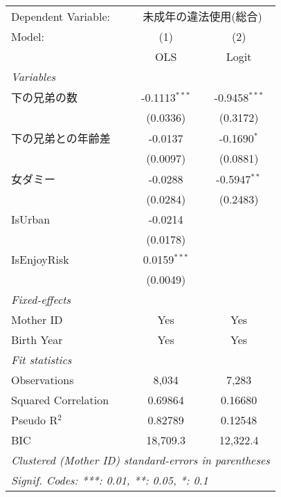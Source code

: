 \documentclass{article}
\begin{document}
\begingroup
\centering
\begin{tabular}{lcc}
   \tabularnewline \midrule \midrule
   Dependent Variable: & \multicolumn{2}{c}{未成年の違法使用(総合)}\\
   Model:              & (1)             & (2)\\  
                       &  OLS            & Logit\\  
   \midrule
   \emph{Variables}\\
   下の兄弟の数        & -0.1113$^{***}$ & -0.9458$^{***}$\\   
                       & (0.0336)        & (0.3172)\\   
   下の兄弟との年齢差  & -0.0137         & -0.1690$^{*}$\\   
                       & (0.0097)        & (0.0881)\\   
   女ダミー            & -0.0288         & -0.5947$^{**}$\\   
                       & (0.0284)        & (0.2483)\\   
   IsUrban             & -0.0214         &   \\   
                       & (0.0178)        &   \\   
   IsEnjoyRisk         & 0.0159$^{***}$  &   \\   
                       & (0.0049)        &   \\   
   \midrule
   \emph{Fixed-effects}\\
   Mother ID           & Yes             & Yes\\  
   Birth Year          & Yes             & Yes\\  
   \midrule
   \emph{Fit statistics}\\
   Observations        & 8,034           & 7,283\\  
   Squared Correlation & 0.69864         & 0.16680\\  
   Pseudo R$^2$        & 0.82789         & 0.12548\\  
   BIC                 & 18,709.3        & 12,322.4\\  
   \midrule \midrule
   \multicolumn{3}{l}{\emph{Clustered (Mother ID) standard-errors in parentheses}}\\
   \multicolumn{3}{l}{\emph{Signif. Codes: ***: 0.01, **: 0.05, *: 0.1}}\\
\end{tabular}
\par\endgroup
\end{document}

